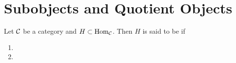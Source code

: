 \documentclass{book}
\begin{document}
	
	
	
	
	
	
	
	
	
	
	
	
	
	
	
	
	
	
	
	
	
	
	
	
	
	
	
	
	
	
	
	
	
	
	
	
	
	
	
	
	
	
	
	
	
	
	
	
	
	
	
	
	
	
	
	
	
	
	
	
	
	
	
	
	
	
	
	
	
	
	
	
	
	
	
	
	
	\newpage
	\section{Subobjects and Quotient Objects}
	
	\begin{defn}
		Let $\mathcal{C}$ be a category and $H \subset \operatorname{Hom}_{\mathcal{C}}$. Then $H$ is said to be  if 
		\begin{enumerate}
			\item 
			\item 
		\end{enumerate}
	\end{defn}
	
\end{document}
